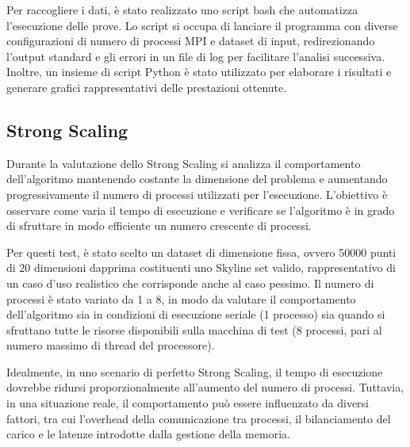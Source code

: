 \documentclass[letterpaper,11pt,leqno]{article}
\begin{document}
Per raccogliere i dati, è stato realizzato uno script bash che automatizza l'esecuzione delle prove. Lo script si occupa di lanciare il programma con diverse configurazioni di numero di processi MPI e dataset di input, redirezionando l'output standard e gli errori in un file di log per facilitare l'analisi successiva. Inoltre, un insieme di script Python è stato utilizzato per elaborare i risultati e generare grafici rappresentativi delle prestazioni ottenute.  

\subsection{Strong Scaling}

Durante la valutazione dello Strong Scaling si analizza il comportamento dell'algoritmo mantenendo costante la dimensione del problema e aumentando progressivamente il numero di processi utilizzati per l'esecuzione. L'obiettivo è osservare come varia il tempo di esecuzione e verificare se l'algoritmo è in grado di sfruttare in modo efficiente un numero crescente di processi.  

Per questi test, è stato scelto un dataset di dimensione fissa, ovvero 50000 punti di 20 dimensioni dapprima costituenti uno Skyline set valido, rappresentativo di un caso d'uso realistico che corrisponde anche al caso pessimo. Il numero di processi è stato variato da 1 a 8, in modo da valutare il comportamento dell'algoritmo sia in condizioni di esecuzione seriale (1 processo) sia quando si sfruttano tutte le risorse disponibili sulla macchina di test (8 processi, pari al numero massimo di thread del processore).  

Idealmente, in uno scenario di perfetto Strong Scaling, il tempo di esecuzione dovrebbe ridursi proporzionalmente all'aumento del numero di processi. Tuttavia, in una situazione reale, il comportamento può essere influenzato da diversi fattori, tra cui l'overhead della comunicazione tra processi, il bilanciamento del carico e le latenze introdotte dalla gestione della memoria. 
\end{document}
